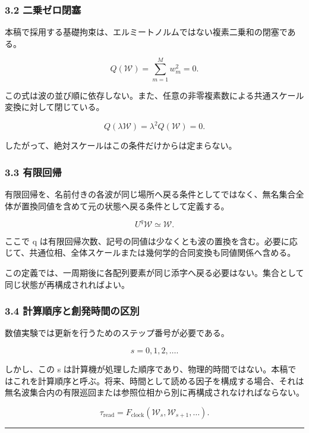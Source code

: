 \documentclass[
  a4paper,
]{ltjsarticle}
\begin{document}
\subsubsection{3.2
二乗ゼロ閉塞}\label{ux4e8cux4e57ux30bcux30edux9589ux585e}

本稿で採用する基礎拘束は、エルミートノルムではない複素二乗和の閉塞である。

\[
Q(\mathcal W)
=
\sum_{m=1}^{M}w_m^2
=0.
\]

この式は波の並び順に依存しない。また、任意の非零複素数による共通スケール変換に対して閉じている。

\[
Q(\lambda\mathcal W)
=
\lambda^2Q(\mathcal W)
=0.
\]

したがって、絶対スケールはこの条件だけからは定まらない。

\subsubsection{3.3 有限回帰}\label{ux6709ux9650ux56deux5e30}

有限回帰を、名前付きの各波が同じ場所へ戻る条件としてではなく、無名集合全体が置換同値を含めて元の状態へ戻る条件として定義する。

\[
U^q\mathcal W
\simeq
\mathcal W.
\]

ここで q
は有限回帰次数、記号の同値は少なくとも波の置換を含む。必要に応じて、共通位相、全体スケールまたは幾何学的合同変換も同値関係へ含める。

この定義では、一周期後に各配列要素が同じ添字へ戻る必要はない。集合として同じ状態が再構成されればよい。

\subsubsection{3.4
計算順序と創発時間の区別}\label{ux8a08ux7b97ux9806ux5e8fux3068ux5275ux767aux6642ux9593ux306eux533aux5225}

数値実験では更新を行うためのステップ番号が必要である。

\[
s=0,1,2,\ldots.
\]

しかし、この s
は計算機が処理した順序であり、物理的時間ではない。本稿ではこれを計算順序と呼ぶ。将来、時間として読める因子を構成する場合、それは無名波集合内の有限巡回または参照位相から別に再構成されなければならない。

\[
\tau_{\mathrm{read}}
=
F_{\mathrm{clock}}(\mathcal W_s,\mathcal W_{s+1},\ldots).
\]

\begin{center}\rule{0.5\linewidth}{0.5pt}\end{center}
\end{document}
